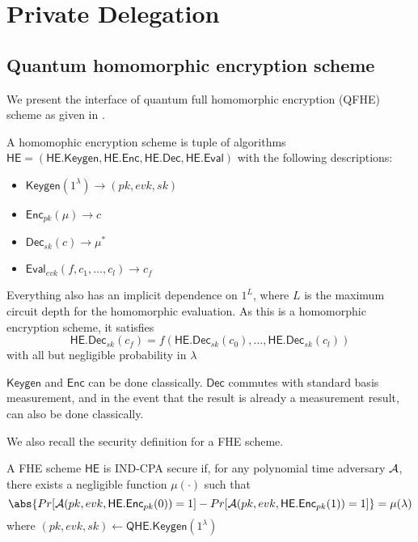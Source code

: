 \section{Private Delegation}


\subsection{Quantum homomorphic encryption scheme}


We present the interface of quantum full homomorphic encryption (QFHE) scheme as given in \cite{mahadev_qfhe}.

\begin{dfn}
	A homomophic encryption scheme is tuple of algorithms $\mathsf{HE}=(\mathsf{HE.Keygen}, \mathsf{HE.Enc}, \mathsf{HE.Dec}, \mathsf{HE.Eval})$ with the following descriptions:
	\begin{itemize}
		\item $\mathsf{Keygen}(1^\lambda)\rightarrow(pk, evk, sk)$
		\item $\mathsf{Enc}_{pk}(\mu)\rightarrow c$
		\item $\mathsf{Dec}_{sk}(c)\rightarrow \mu^*$
		\item $\mathsf{Eval}_{evk}(f, c_1, \ldots, c_l)\rightarrow c_f$
	\end{itemize}
\end{dfn}

Everything also has an implicit dependence on $1^L$, where $L$ is the maximum circuit depth for the homomorphic evaluation.
As this is a homomorphic encryption scheme, it satisfies $$\mathsf{HE.Dec}_{sk}(c_f)=f(\mathsf{HE.Dec}_{sk}(c_0),\ldots,\mathsf{HE.Dec}_{sk}(c_l))$$ with all but negligible probability in $\lambda$

$\mathsf{Keygen}$ and $\mathsf{Enc}$ can be done classically. $\mathsf{Dec}$ commutes with standard basis measurement, and in the event that the result is already a measurement result, can also be done classically.

We also recall the security definition for a FHE scheme.

\begin{dfn}
	A FHE scheme $\mathsf{HE}$ is IND-CPA secure if, for any polynomial time adversary $\mathcal{A}$, there exists a negligible function $\mu(\cdot)$ such that
	$$\abs{Pr[\cA(pk, evk, \mathsf{HE.Enc}_{pk}(0))=1]-Pr[\cA(pk, evk, \mathsf{HE.Enc}_{pk}(1))=1]}=\mu(\lambda)$$
	where $(pk, evk, sk)\leftarrow\mathsf{QHE.Keygen}(1^\lambda)$
\end{dfn}

